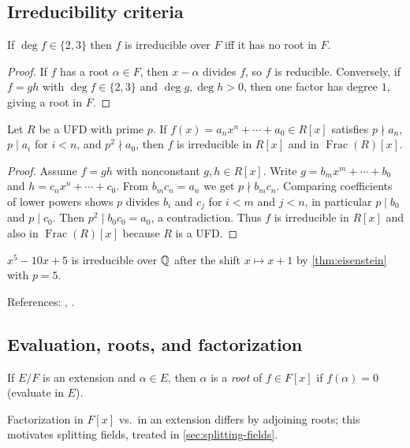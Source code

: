 \subsection{Irreducibility criteria}
\begin{proposition}[Degree $2$ or $3$]
If $\deg f\in\{2,3\}$ then $f$ is irreducible over $F$ iff it has no root in $F$.
\end{proposition}
\begin{proof}
If $f$ has a root $\alpha\in F$, then $x-\alpha$ divides $f$, so $f$ is reducible. Conversely, if $f=gh$ with $\deg f\in\{2,3\}$ and $\deg g,\deg h>0$, then one factor has degree $1$, giving a root in $F$.
\end{proof}
\begin{theorem}[Eisenstein]\label{thm:eisenstein}
Let $R$ be a UFD with prime $p$. If $f(x)=a_nx^n+\cdots+a_0\in R[x]$ satisfies $p\nmid a_n$, $p\mid a_i$ for $i<n$, and $p^2\nmid a_0$, then $f$ is irreducible in $R[x]$ and in $\operatorname{Frac}(R)[x]$.
\end{theorem}
\begin{proof}
Assume $f=gh$ with nonconstant $g,h\in R[x]$. Write $g=b_m x^{m}+\cdots+b_0$ and $h=c_n x^{n}+\cdots+c_0$. From $b_m c_n=a_n$ we get $p\nmid b_m c_n$. Comparing coefficients of lower powers shows $p$ divides $b_i$ and $c_j$ for $i<m$ and $j<n$, in particular $p\mid b_0$ and $p\mid c_0$. Then $p^2\mid b_0c_0=a_0$, a contradiction. Thus $f$ is irreducible in $R[x]$ and also in $\operatorname{Frac}(R)[x]$ because $R$ is a UFD.
\end{proof}
\begin{example}
$x^5-10x+5$ is irreducible over $\mathbb{Q}$ after the shift $x\mapsto x+1$ by \cref{thm:eisenstein} with $p=5$.
\end{example}
References: \cite[\S9--11]{DF}, \cite[Ch.~II]{Lang}.

\subsection{Evaluation, roots, and factorization}
\begin{definition}
If $E/F$ is an extension and $\alpha\in E$, then $\alpha$ is a \emph{root} of $f\in F[x]$ if $f(\alpha)=0$ (evaluate in $E$).
\end{definition}
\begin{remark}
Factorization in $F[x]$ vs.\ in an extension differs by adjoining roots; this motivates splitting fields, treated in \cref{sec:splitting-fields}.
\end{remark}
